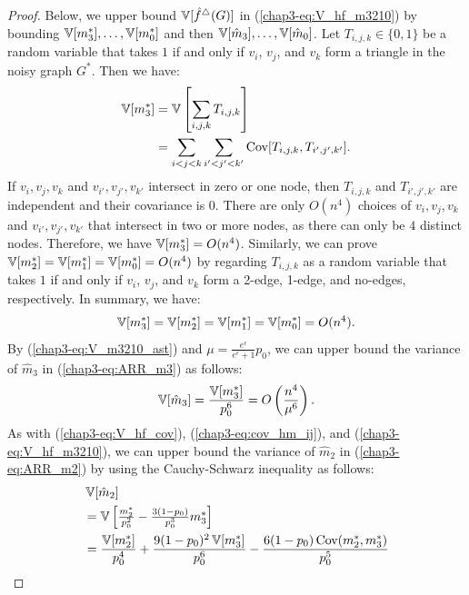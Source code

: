 \begin{proof}
Below, we upper bound $\operatorname{\mathbb{V}}[\hat{f}^\triangle(G)]$ in (\ref{chap3-eq:V_hf_m3210}) by bounding $\operatorname{\mathbb{V}}[m_3^*], \ldots, \allowbreak \operatorname{\mathbb{V}}[m_0^*]$ and then $\operatorname{\mathbb{V}}[\hat{m}_3], \ldots, \allowbreak \operatorname{\mathbb{V}}[\hat{m}_0]$.
Let $T_{i,j,k} \in \{0,1\}$ be a random variable that takes $1$ if and only if $v_i$, $v_j$, and $v_k$ form a triangle in the noisy graph $G^*$.
Then we have:
\begin{align*}
    \operatorname{\mathbb{V}}[m_3^*]
    &= \operatorname{\mathbb{V}}\left[\sum_{i,j,k} T_{i,j,k}\right] \\
    &= \sum_{i<j<k} \sum_{i'<j'<k'} \operatorname{\text{Cov}}[T_{i,j,k}, T_{i',j',k'}].
\end{align*}
If $v_i, v_j, v_k$ and $v_{i'}, v_{j'}, v_{k'}$ intersect in zero or one node, then $T_{i,j,k}$ and $T_{i',j',k'}$ are independent
and their covariance is $0$.
There are only $O(n^4)$ choices of $v_i, v_j, v_k$ and $v_{i'}, v_{j'}, v_{k'}$ that intersect in two or more nodes, as there can only be $4$ distinct nodes.
Therefore, we have $\operatorname{\mathbb{V}}[m_3^*] = O(n^4)$.
Similarly, we can prove $\operatorname{\mathbb{V}}[m_2^*] = \operatorname{\mathbb{V}}[m_1^*] = \operatorname{\mathbb{V}}[m_0^*] = O(n^4)$ by regarding $T_{i,j,k}$ as a random variable that takes $1$ if and only if $v_i$, $v_j$, and $v_k$ form a 2-edge, 1-edge, and no-edges, respectively.
In summary, we have:
\begin{align}
    \operatorname{\mathbb{V}}[m_3^*] = \operatorname{\mathbb{V}}[m_2^*] = \operatorname{\mathbb{V}}[m_1^*] = \operatorname{\mathbb{V}}[m_0^*] = O(n^4).
    \label{chap3-eq:V_m3210_ast}
\end{align}
By (\ref{chap3-eq:V_m3210_ast}) and $\mu = \frac{e^\epsilon}{e^\epsilon+1} p_0$, we can upper bound the variance of $\hat{m}_3$ in (\ref{chap3-eq:ARR_m3}) as follows:
\begin{align*}
    \operatorname{\mathbb{V}}[\hat{m}_3]
    = \frac{\operatorname{\mathbb{V}}[m_3^*]}{p_0^6}
    = O\left(\frac{n^4}{\mu^6}\right).
\end{align*}
As with (\ref{chap3-eq:V_hf_cov}), (\ref{chap3-eq:cov_hm_ij}), and (\ref{chap3-eq:V_hf_m3210}), we can upper bound the variance of $\hat{m}_2$ in (\ref{chap3-eq:ARR_m2}) by using the Cauchy-Schwarz inequality as follows:
\begin{align*}
    & \V[\hat{m}_2] \\
    &= \textstyle{\V\left[\frac{m_2^*}{p_0^2} - \frac{3(1-p_0)}{p_0^3}m_3^*\right]} \\
    &= \frac{\V[m_2^*]}{p_0^4} + \frac{9(1-p_0)^2\V[m_3^*]}{p_0^6} - \frac{6(1-p_0)\cov(m_2^*,m_3^*)}{p_0^5} \\

\end{align*}
\end{proof}
